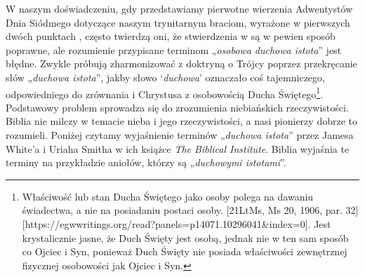 W naszym doświadczeniu, gdy przedstawiamy pierwotne wierzenia Adwentystów Dnia Siódmego dotyczące  naszym trynitarnym braciom, wyrażone w pierwszych dwóch punktach , często twierdzą oni, że stwierdzenia w  są w pewien sposób poprawne, ale rozumienie przypisane terminom „\textit{osobowa duchowa istota}” jest błędne. Zwykle próbują zharmonizować  z doktryną o Trójcy poprzez przekręcanie słów „\textit{duchowa istota}”, jakby słowo ‘\textit{duchowa}’ oznaczało coś tajemniczego, odpowiedniego do zrównania  i Chrystusa z osobowością Ducha Świętego\footnote{Właściwość lub stan Ducha Świętego jako osoby polega na dawaniu świadectwa, a nie na posiadaniu postaci osoby. [21LtMs, Ms 20, 1906, par. 32][https://egwwritings.org/read?panels=p14071.10296041&index=0]. Jest krystalicznie jasne, że Duch Święty jest osobą, jednak nie w ten sam sposób co Ojciec i Syn, ponieważ Duch Święty nie posiada właściwości zewnętrznej fizycznej osobowości jak Ojciec i Syn.}. Podstawowy problem sprowadza się do zrozumienia niebiańskich rzeczywistości. Biblia nie milczy w temacie nieba i jego rzeczywistości, a nasi pionierzy dobrze to rozumieli. Poniżej czytamy wyjaśnienie terminów „\textit{duchowa istota}” przez Jamesa White'a i Uriaha Smitha w ich książce \textit{The Biblical Institute}. Biblia wyjaśnia te terminy na przykładzie aniołów, którzy są „\textit{duchowymi istotami}”.


